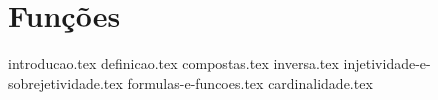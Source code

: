\chapter{Funções}
{
    \newcommand{\chapterdir}{../capitulos/funcoes/}
    
    {introducao.tex}
    {definicao.tex}
    {compostas.tex}
    {inversa.tex}
    {injetividade-e-sobrejetividade.tex}
    {formulas-e-funcoes.tex}
    {cardinalidade.tex}
}